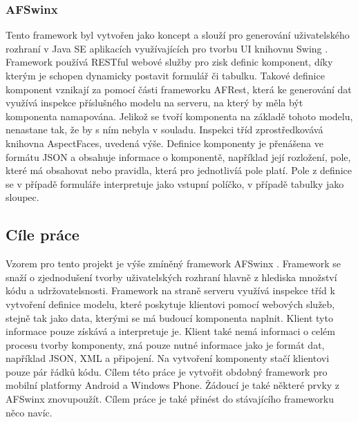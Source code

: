 \subsubsection{AFSwinx}
Tento framework byl vytvořen jako koncept a slouží pro generování uživatelského rozhraní v Java SE aplikacích využívajících pro tvorbu UI knihovnu Swing \cite{tomasek-thesis}. Framework používá RESTful webové služby pro zisk definic komponent, díky kterým je schopen dynamicky postavit formulář či tabulku. Takové definice komponent vznikají za pomocí části frameworku AFRest, která ke generování dat využívá inspekce příslušného modelu na serveru, na který by měla být komponenta namapována. Jelikož se tvoří komponenta na základě tohoto modelu, nenastane tak, že by s ním nebyla v souladu. Inspekci tříd zprostředkovává knihovna AspectFaces, uvedená výše. Definice komponenty je přenášena ve formátu JSON a obsahuje informace o komponentě, například její rozložení, pole, které má obsahovat nebo pravidla, která pro jednotlivíá pole platí. Pole z definice se v případě formuláře interpretuje jako vstupní políčko, v případě tabulky jako sloupec. 

\subsection{Cíle práce}
Vzorem pro tento projekt je výše zmíněný framework AFSwinx \cite{tomasek-thesis}. Framework se snaží o zjednodušení tvorby uživatelských rozhraní hlavně z hlediska množství kódu a udržovatelsnosti. Framework na straně serveru využívá inspekce tříd k vytvoření definice modelu, které poskytuje klientovi pomocí webových služeb, stejně tak jako data, kterými se má budoucí komponenta naplnit. Klient tyto informace pouze získává a interpretuje je. Klient také nemá informaci o celém procesu tvorby komponenty, zná pouze nutné informace jako je formát dat, například JSON, XML a připojení. Na vytvoření komponenty stačí klientovi pouze pár řádků kódu. Cílem této práce je vytvořit obdobný framework pro mobilní platformy Android a Windows Phone. Žádoucí je také některé prvky z AFSwinx znovupoužít. Cílem práce je také přinést do stávajícího frameworku něco navíc.
